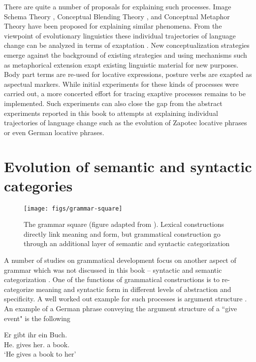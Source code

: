 There are quite a number of proposals for explaining such processes. 
Image Schema Theory \citep{johnson1987body}, 
Conceptual Blending Theory \citep{fauconnier1994mental}, and
Conceptual Metaphor Theory \citep{lakoff1980metaphors}
have been proposed for explaining similar phenomena.
From the viewpoint of evolutionary linguistics these individual 
trajectories of language change can be analyzed in terms of exaptation 
\citep{lass1990things,lass1997historical}. New conceptualization strategies emerge 
against the background of existing
strategies and using mechanisms such as metaphorical extension exapt
existing linguistic material for new purposes. Body part terms are re-used
for locative expressions, posture verbs are exapted as aspectual markers.
While initial experiments for these kinds of processes were carried out, a 
more concerted effort for tracing exaptive processes remains to be implemented.
Such experiments can also close the gap from the abstract experiments reported
in this book to attempts at explaining individual trajectories of language change
such as the evolution of Zapotec locative phrases or even German locative phrases.

\section{Evolution of semantic and syntactic categories}
\begin{figure}
\begin{center}
\texttt{[image: figs/grammar-square]}
\end{center}
\caption[Grammar square]{The grammar square (figure 
adapted from \citealp{steels2011design}). Lexical constructions directly link meaning
and form, but grammatical construction go through an additional layer of
semantic and syntactic categorization}
\label{f:grammar-square}
\end{figure}

A number of studies on grammatical development focus on another aspect
of grammar which was not discussed in this book -- syntactic and semantic categorization \citep{steels2011phrasal}.
One of the functions of grammatical constructions is to re-categorize meaning 
and syntactic form in different levels of abstraction and specificity. 
A well worked out example for such processes is argument structure 
\citep{steels2002case,steels2007multi-level,vantrijp2008phd}. 
An example of a German phrase conveying the argument structure of a ``give event"
is the following 
\begin{exe}
	\ex
\gll Er gibt ihr ein Buch.\\
{He.\NOM} gives {her.\DAT} a {book.\ACC}\\
\glt `He gives a book to her'
\end{exe}

